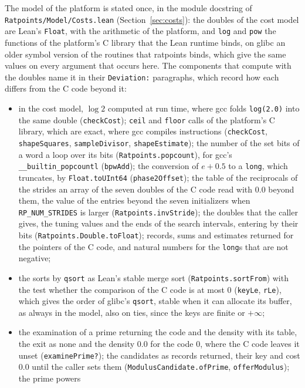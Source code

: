 The model of the platform is stated once, in the module docstring of
\verb|Ratpoints/Model/Costs.lean| (Section~\ref{sec:costs}): the doubles of the cost model are
Lean's \verb|Float|, with the arithmetic of the platform, and \verb|log| and \verb|pow| the
functions of the platform's C library that the Lean runtime binds, on glibc an older symbol version
of the routines that ratpoints binds, which give the same values on every argument that occurs here.
The components that compute with the doubles name it in their \verb|Deviation:| paragraphs, which
record how each differs from the C code beyond it:
\begin{itemize}
  \item in the cost model, $\log 2$ computed at run time, where gcc folds \verb|log(2.0)| into the
    same double (\verb|checkCost|); \verb|ceil| and \verb|floor| calls of the platform's C library,
    which are exact, where gcc compiles instructions (\verb|checkCost|, \verb|shapeSquares|,
    \verb|sampleDivisor|, \verb|shapeEstimate|); the number of the set bits of a word a loop over
    its bits (\verb|Ratpoints.popcount|), for gcc's \verb|__builtin_popcountl| (\verb|bpwAdd|); the
    conversion of $e + 0.5$ to a \verb|long|, which truncates, by \verb|Float.toUInt64|
    (\verb|phase2Offset|); the table of the reciprocals of the strides an array of the seven doubles
    of the C code read with $0.0$ beyond them, the value of the entries beyond the seven
    initializers when \verb|RP_NUM_STRIDES| is larger (\verb|Ratpoints.invStride|); the doubles that
    the caller gives, the tuning values and the ends of the search intervals, entering by their bits
    (\verb|Ratpoints.Double.toFloat|); records, sums and estimates returned for the pointers of the
    C code, and natural numbers for the \verb|long|s that are not negative;
  \item the sorts by \verb|qsort| as Lean's stable merge sort (\verb|Ratpoints.sortFrom|) with the
    test whether the comparison of the C code is at most $0$ (\verb|keyLe|, \verb|rLe|), which gives
    the order of glibc's \verb|qsort|, stable when it can allocate its buffer, as always in the
    model, also on ties, since the keys are finite or $+\infty$;
  \item the examination of a prime returning the code and the density with its table, the exit as
    none and the density $0.0$ for the code $0$, where the C code leaves it unset
    (\verb|examinePrime?|); the candidates as records returned, their key and cost $0.0$ until the
    caller sets them (\verb|ModulusCandidate.ofPrime|, \verb|offerModulus|); the prime powers

\end{itemize}
